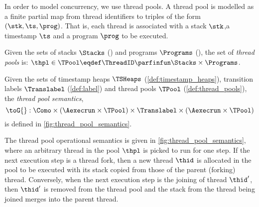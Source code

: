 In order to model concurrency, we use thread pools.
A thread pool is modelled as a finite partial map from thread identifiers to triples of the form $(\stk, \ts, \prog)$. That is, each thread is associated with a stack $\stk$,a timestamp $\ts$ and a program $\prog$ to be executed. 

\begin{defn}
\label{def:thread_pools}
Given the sets of stacks $\Stacks$ () and programs $\Programs$ (), the set of \emph{thread pools} is: $\thpl \in \TPool \eqdef \ThreadID \parfinfun \Stacks \times \Programs$.
\end{defn}
 
\begin{defn} 
\label{def:thread_pool_semantics}
Given the sets of timestamp heaps $\TSHeaps$ (\ref{def:timestamp_heaps}), transition labels \( \Translabel \) (\ref{def:label}) and thread pools $\TPool$ (\ref{def:thread_pools}), the \emph{thread pool semantics}, 
%
\[
	\toG{} : \Como \times (\Aexecrun \times \TPool) \times \Translabel \times (\Aexecrun \times \TPool) 
\]
%
is defined in \fig\ref{fig:thread_pool_semantics}.
%
\end{defn}
%
The thread pool operational semantics is given in \fig\ref{fig:thread_pool_semantics}, where an arbitrary thread in the pool $\thpl$ is picked to run for one step.
If the next execution step is a thread fork, then a new thread $\thid$ is allocated in the pool to be executed with its stack copied from those of the parent (forking) thread.
Conversely, when the next execution step is the joining of thread $\thid'$, then $\thid'$ is removed from the thread pool and the stack from the thread being joined merges into the parent thread.
%
